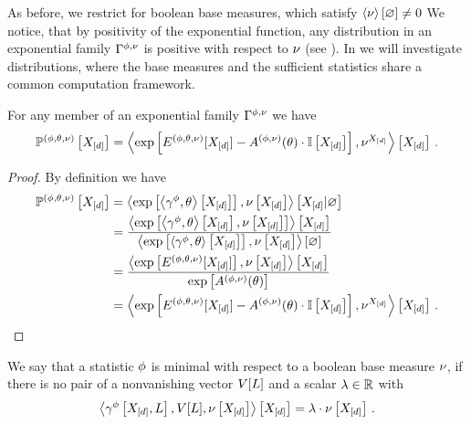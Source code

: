 As before, we restrict for boolean base measures, which satisfy $\left\langle \nu\right\rangle \left[ \varnothing \right]\neq0$
We notice, that by positivity of the exponential function, any distribution in an exponential family $\Gamma^{\phi,\nu}$ is positive with respect to $\nu$ (see ).
In  we will investigate distributions, where the base measures and the sufficient statistics share a common computation framework.



\begin{lemma}\label{lem:energyCumulantRepresentation}
	For any member of an exponential family $\Gamma^{\phi,\nu}$ we have
		\[ \mathbb{P}^{(\phi,\theta,\nu)}\left[X_{[d]}\right] 
		= \left\langle \mathrm{exp}\left[ E^{(\phi,\theta,\nu)}[X_{[d]}] - A^{(\phi,\nu)}(\theta)\cdot \mathbb{I}\left[X_{[d]}\right]\right],\nu^{X_{[d]}}\right\rangle \left[ X_{[d]} \right] \, . \]
\end{lemma}
\begin{proof}
	By definition we have
	\begin{align*}
		\mathbb{P}^{(\phi,\theta,\nu)}\left[X_{[d]}\right] 
		&= \left\langle 
		\mathrm{exp}\left[\left\langle \gamma^{\phi},\theta\right\rangle \left[ X_{[d]} \right]\right],\nu\left[X_{[d]}\right]
		\right\rangle \left[ X_{[d]} | \varnothing \right] \\
		&= \frac{\left\langle \mathrm{exp}\left[\left\langle \gamma^{\phi},\theta\right\rangle \left[ X_{[d]} \right],\nu\left[X_{[d]}\right]\right]\right\rangle \left[ X_{[d]} \right]
			}{\left\langle \mathrm{exp}\left[\left\langle \gamma^{\phi},\theta	\right\rangle \left[ X_{[d]} \right]\right],\nu\left[X_{[d]}\right]\right\rangle \left[ \varnothing \right]} \\
		&=  \frac{
		\left\langle \mathrm{exp}\left[E^{(\phi,\theta,\nu)}[X_{[d]}]\right],\nu\left[X_{[d]}\right]\right\rangle \left[ X_{[d]} \right]
		}{
		\mathrm{exp}\left[A^{(\phi,\nu)}(\theta)\right]
		} \\
		& = \left\langle \mathrm{exp}\left[ E^{(\phi,\theta,\nu)}[X_{[d]}] - A^{(\phi,\nu)}(\theta)\cdot \mathbb{I}\left[X_{[d]}\right]\right],\nu^{X_{[d]}}\right\rangle \left[ X_{[d]} \right] \, . 
	\end{align*}
\end{proof}



\begin{definition}[Minimal]\label{def:minimalStatistics}
	We say that a statistic $\phi$ is minimal with respect to a boolean base measure $\nu$, if there is no pair of a nonvanishing vector $V[L]$ and a scalar $\lambda\in\mathbb{R}$ with
		\[ \left\langle \gamma^{\phi}\left[X_{[d]},L\right],V[L],\nu\left[X_{[d]}\right]\right\rangle \left[ X_{[d]} \right] = \lambda\cdot\nu\left[X_{[d]}\right] \, . \]
\end{definition}




